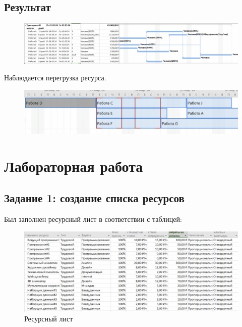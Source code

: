 \subsection*{Результат}


\begin{figure}[h!]
	\begin{center}
		\includegraphics[scale=0.28]{inc/img/p_1.png}
	\end{center}
	\label{fig:u1}
\end{figure}

Наблюдается перегрузка ресурса.

\begin{figure}[h!]
	\begin{center}
		\includegraphics[scale=0.45]{inc/img/p_2.png}
	\end{center}
	\label{fig:u1}
\end{figure}


\section*{Лабораторная работа}

\subsection*{Задание 1: создание списка ресурсов}

Был заполнен ресурсный лист в соответствии с таблицей:

\begin{figure}[h!]
	\begin{center}
		\includegraphics[scale=0.45]{inc/img/p_3.png}
	\end{center}
	\captionsetup{justification=centering}
	\caption{Ресурсный лист}
	\label{fig:u3}
\end{figure}

